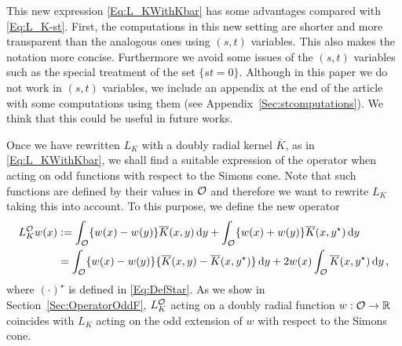 This new expression \eqref{Eq:L_KWithKbar} has some advantages compared with \eqref{Eq:L_K-st}. First, the computations in this new setting are shorter and more transparent than the analogous ones using $(s,t)$ variables. This also makes the notation more concise. Furthermore we avoid some issues of the $(s,t)$ variables such as the special treatment of the set $\{st=0\}$. Although in this paper we do not work in $(s,t)$ variables, we include an appendix at the end of the article with some computations using them (see Appendix~\ref{Sec:stcomputations}). We think that this could be useful in future works.  


Once we have rewritten $L_K$ with a doubly radial kernel $\overline{K}$, as in \eqref{Eq:L_KWithKbar}, we shall find a suitable expression of the operator when acting on odd functions with respect to the Simons cone. Note that such functions are defined by their values in $\mathcal{O}$ and therefore we want to rewrite $L_K$ taking this into account. To this purpose, we define the new operator
\begin{equation}
\label{Eq:OperatorOddF}
\begin{split}
L_K^{\mathcal{O}} w (x)  &:= \int_{\mathcal{O}} \{w(x) - w(y) \} \overline{K}(x, y) \,\mathrm{d} y +  \int_{\mathcal{O}} \{w(x) + w(y) \} \overline{K}(x, y^\star) \,\mathrm{d} y \\
&= \int_{\mathcal{O}} \{w(x) - w(y) \} \{\overline{K}(x, y) - \overline{K}(x, y^\star)  \} \,\mathrm{d} y +  2 w(x) \int_{\mathcal{O}} \overline{K}(x, y^\star) \,\mathrm{d} y \,,
\end{split}
\end{equation}
where $(\cdot)^\star$ is defined in \eqref{Eq:DefStar}. As we show in Section~\ref{Sec:OperatorOddF}, $L_K^{\mathcal{O}}$ acting on a doubly radial function $w:\mathcal{O} \to \mathbb{R}$ coincides with $L_K$ acting on the odd extension of $w$ with respect to the Simons cone.


